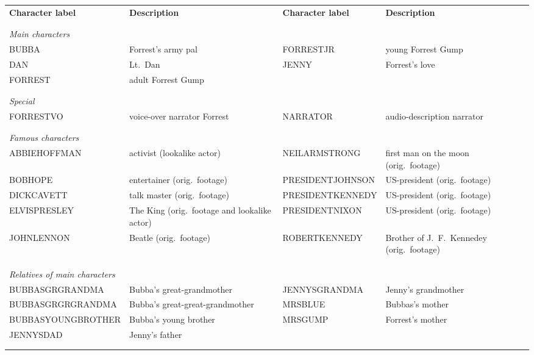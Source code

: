 \documentclass[10pt,a4paper,twocolumn]{article}
\begin{document}
\begin{table}
  \centering
  \begin{tabular}{p{4cm}p{4cm}p{3.6cm}p{4cm}}
    \textbf{Character label} & \textbf{Description} & \textbf{Character label} & \textbf{Description} \\
\\\hline\\

\multicolumn{4}{l}{\textit{Main characters}} \\
BUBBA     & Forrest's army pal & FORRESTJR & young Forrest Gump \\
DAN       & Lt.~Dan & JENNY     & Forrest's love \\
FORREST   & adult Forrest Gump &           & \\
\\\hline\\

\multicolumn{4}{l}{\textit{Special}} \\
FORRESTVO & voice-over narrator Forrest & NARRATOR & audio-description narrator \\
\\\hline\\

\multicolumn{4}{l}{\textit{Famous characters}} \\
 ABBIEHOFFMAN     & activist (lookalike actor)                   & NEILARMSTRONG    & first man on the moon (orig.~footage) \\ 
 BOBHOPE          & entertainer (orig.~footage)                  & PRESIDENTJOHNSON & US-president (orig.~footage) \\
 DICKCAVETT       & talk master (orig.~footage)                  & PRESIDENTKENNEDY & US-president (orig.~footage) \\
 ELVISPRESLEY     & The King (orig.~footage and lookalike actor) & PRESIDENTNIXON   & US-president (orig.~footage)  \\
 JOHNLENNON       & Beatle (orig.~footage)                       & ROBERTKENNEDY    & Brother of J.~F.~Kennedey (orig.~footage) \\                  & \\
\\\hline\\

\multicolumn{4}{l}{\textit{Relatives of main characters}} \\
BUBBASGRGRANDMA   & Bubba's great-grandmother & JENNYSGRANDMA & Jenny's grandmother\\
BUBBASGRGRGRANDMA & Bubba's great-great-grand\-mother & MRSBLUE       & Bubbas's mother\\
BUBBASYOUNGBROTHER      & Bubba's young brother & MRSGUMP       & Forrest's mother \\
JENNYSDAD               & Jenny's father &              & \\
\\\hline\\


\end{tabular}
\end{table}
\end{document}
